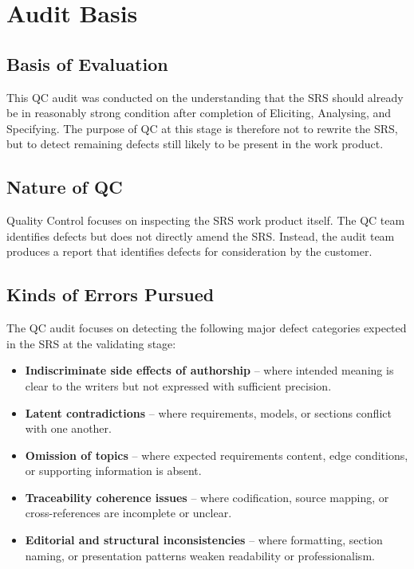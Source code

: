 \documentclass[11pt,a4paper]{article}
\begin{document}
\section{Audit Basis}

\subsection{Basis of Evaluation}
This QC audit was conducted on the understanding that the SRS should already be in reasonably strong condition after completion of Eliciting, Analysing, and Specifying. The purpose of QC at this stage is therefore not to rewrite the SRS, but to detect remaining defects still likely to be present in the work product.

\subsection{Nature of QC}
Quality Control focuses on inspecting the SRS work product itself. The QC team identifies defects but does not directly amend the SRS. Instead, the audit team produces a report that identifies defects for consideration by the customer.

\subsection{Kinds of Errors Pursued}
The QC audit focuses on detecting the following major defect categories expected in the SRS at the validating stage:
\begin{itemize}[leftmargin=*]
\item \textbf{Indiscriminate side effects of authorship} -- where intended meaning is clear to the writers but not expressed with sufficient precision.
\item \textbf{Latent contradictions} -- where requirements, models, or sections conflict with one another.
\item \textbf{Omission of topics} -- where expected requirements content, edge conditions, or supporting information is absent.
\item \textbf{Traceability coherence issues} -- where codification, source mapping, or cross-references are incomplete or unclear.
\item \textbf{Editorial and structural inconsistencies} -- where formatting, section naming, or presentation patterns weaken readability or professionalism.
\end{itemize}
\end{document}
